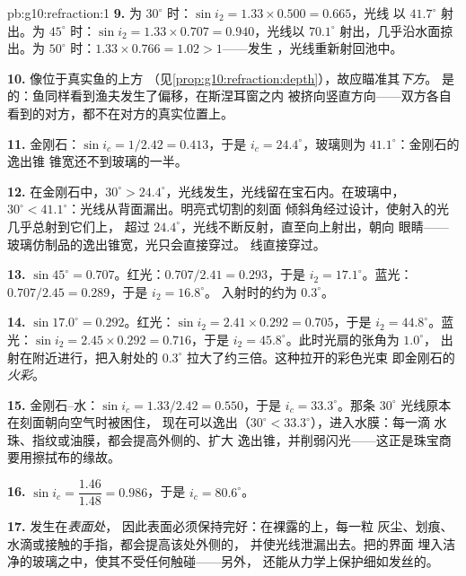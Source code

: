 \begin{solution}{pb:g10:refraction:1}
\textbf{9.} 为 $30^\circ$ 时：$\sin i_2 = 1.33 \times 0.500 = 0.665$，光线
以 $41.7^\circ$ 射出。为 $45^\circ$ 时：$\sin i_2 = 1.33 \times
0.707 = 0.940$，光线以 $70.1^\circ$ 射出，几乎沿水面掠出。为
$50^\circ$ 时：$1.33 \times 0.766 = 1.02 > 1$——发生
，光线重新射回池中。

\textbf{10.} 像位于真实鱼的上方
（见\cref{prop:g10:refraction:depth}），故应瞄准其\emph{下方}。
是的：鱼同样看到渔夫发生了偏移，在斯涅耳窗之内
被挤向竖直方向——双方各自看到的对方，都不在对方的真实位置上。

\textbf{11.} 金刚石：$\sin i_c = 1/2.42 = 0.413$，于是
$i_c = 24.4^\circ$，玻璃则为 $41.1^\circ$：金刚石的逸出锥
锥宽还不到玻璃的一半。

\textbf{12.} 在金刚石中，$30^\circ > 24.4^\circ$，光线发生，光线留在宝石内。在玻璃中，
$30^\circ < 41.1^\circ$：光线从背面漏出。明亮式切割的刻面
倾斜角经过设计，使射入的光几乎总射到它们上，
超过 $24.4^\circ$，光线不断反射，直至向上射出，朝向
眼睛——玻璃仿制品的逸出锥宽，光只会直接穿过。
线直接穿过。

\textbf{13.} $\sin 45^\circ = 0.707$。红光：$0.707/2.41 = 0.293$，于是
$i_2 = 17.1^\circ$。蓝光：$0.707/2.45 = 0.289$，于是 $i_2 = 16.8^\circ$。
入射时的约为 $0.3^\circ$。

\textbf{14.} $\sin 17.0^\circ = 0.292$。红光：$\sin i_2 = 2.41 \times
0.292 = 0.705$，于是 $i_2 = 44.8^\circ$。蓝光：$\sin i_2 = 2.45 \times
0.292 = 0.716$，于是 $i_2 = 45.8^\circ$。此时光扇的张角为 $1.0^\circ$，
出射在附近进行，把入射处的
$0.3^\circ$ 拉大了约三倍。这种拉开的彩色光束
即金刚石的\emph{火彩}。

\textbf{15.} 金刚石–水：$\sin i_c = 1.33/2.42 = 0.550$，于是
$i_c = 33.3^\circ$。那条 $30^\circ$ 光线原本在刻面朝向空气时被困住，
现在可以逸出（$30^\circ < 33.3^\circ$），进入水膜：每一滴
水珠、指纹或油膜，都会提高外侧的、扩大
逸出锥，并削弱闪光——这正是珠宝商要用擦拭布的缘故。

\textbf{16.} $\sin i_c = \dfrac{1.46}{1.48} = 0.986$，于是
$i_c = 80.6^\circ$。

\textbf{17.} 发生在\emph{表面处}，
因此表面必须保持完好：在裸露的上，每一粒
灰尘、划痕、水滴或接触的手指，都会提高该处外侧的，
并使光线泄漏出去。把的界面
埋入洁净的玻璃之中，使其不受任何触碰——另外，
还能从力学上保护细如发丝的。


\end{solution}

